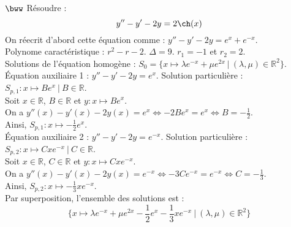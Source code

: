 \documentclass[11pt]{article}
\begin{document}
\begin{exercice}{$\bww$}{}
    Résoudre :
    \begin{equation*}
        y'' - y' - 2y = 2\ch(x)
    \end{equation*}
    \tcblower
    On réecrit d'abord cette équation comme : $y'' - y' - 2y = e^{x} + e^{-x}$.\\
    Polynome caractéristique : $r^2 - r - 2$. $\Delta = 9$. $r_1 = -1$ et $r_2 = 2$.\\
    Solutions de l'équation homogène : $S_0 = \{x \mapsto \lambda e^{-x} + \mu e^{2x} ~ | ~ (\lambda, \mu) \in \mathbb{R}^2\}$.\\
    Équation auxiliaire 1 : $y'' - y' - 2y = e^x$. Solution particulière : $S_{p,1} : x\mapsto Be^{x} ~ | ~ B\in\mathbb{R}$.\\
    Soit $x\in\mathbb{R}$, $B\in\mathbb{R}$ et $y:x\mapsto Be^x$.\\
    On a $y''(x) - y'(x) - 2y(x) = e^x \iff -2Be^x = e^x \iff B = -\frac{1}{2}$.\\
    Ainsi, $S_{p,1}:x\mapsto -\frac{1}{2}e^x$.\\
    Équation auxiliaire 2 : $y'' - y' - 2y = e^{-x}$. Solution particulière : $S_{p,2} : x\mapsto Cxe^{-x} ~ | ~ C\in\mathbb{R}$.\\
    Soit $x\in\mathbb{R}$, $C\in\mathbb{R}$ et $y:x\mapsto Cxe^{-x}$.\\
    On a $y''(x) - y'(x) - 2y(x) = e^{-x} \iff -3Ce^{-x} = e^{-x} \iff C = -\frac{1}{3}$.\\
    Ainsi, $S_{p,2}: x\mapsto -\frac{1}{3}xe^{-x}$.\\
    Par superposition, l'ensemble des solutions est :
    \begin{equation*}
        \{x\mapsto \lambda e^{-x} + \mu e^{2x} - \frac{1}{2}e^x - \frac{1}{3}xe^{-x} ~ | ~ (\lambda, \mu)\in\mathbb{R}^2\}
    \end{equation*}
\end{exercice}
\end{document}
